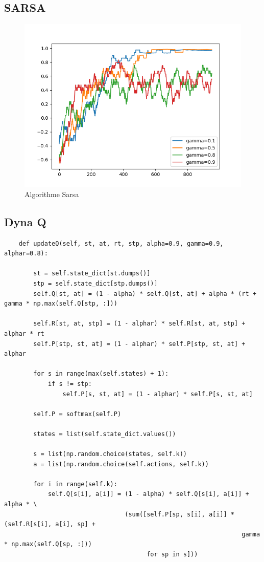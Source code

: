\documentclass{standalone}
\begin{document}
\subsection{SARSA}


\begin{figure}[H]
	\center
	\includegraphics[scale=0.7]{img/sarsa.png}
	\caption{Algorithme Sarsa}
	\label{ql:sarsa}
\end{figure}

\subsection{Dyna Q}

\begin{verbatim}
    def updateQ(self, st, at, rt, stp, alpha=0.9, gamma=0.9, alphar=0.8):

        st = self.state_dict[st.dumps()]
        stp = self.state_dict[stp.dumps()]
        self.Q[st, at] = (1 - alpha) * self.Q[st, at] + alpha * (rt + gamma * np.max(self.Q[stp, :]))

        self.R[st, at, stp] = (1 - alphar) * self.R[st, at, stp] + alphar * rt
        self.P[stp, st, at] = (1 - alphar) * self.P[stp, st, at] + alphar

        for s in range(max(self.states) + 1):
            if s != stp:
                self.P[s, st, at] = (1 - alphar) * self.P[s, st, at]

        self.P = softmax(self.P)

        states = list(self.state_dict.values())

        s = list(np.random.choice(states, self.k))
        a = list(np.random.choice(self.actions, self.k))

        for i in range(self.k):
            self.Q[s[i], a[i]] = (1 - alpha) * self.Q[s[i], a[i]] + alpha * \
                                 (sum([self.P[sp, s[i], a[i]] * (self.R[s[i], a[i], sp] +
                                                                 gamma * np.max(self.Q[sp, :]))
                                       for sp in s]))

\end{verbatim}
\end{document}
